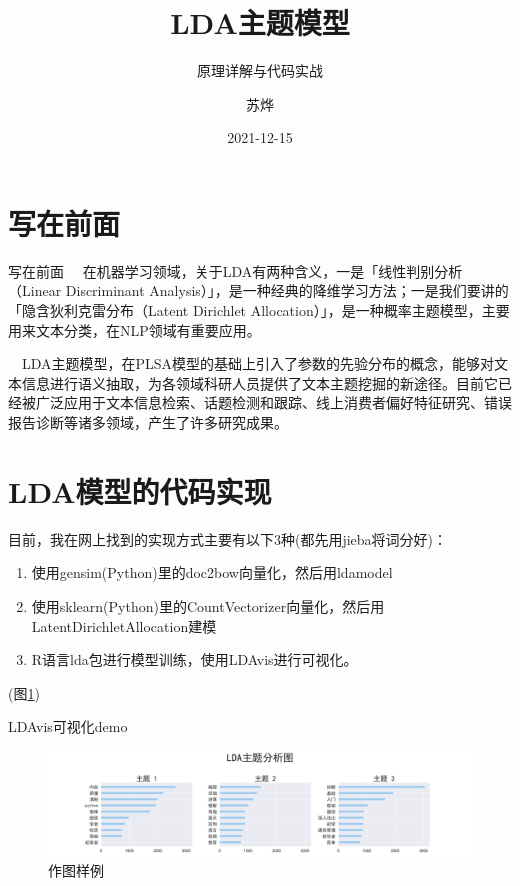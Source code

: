\documentclass[
  ignorenonframetext,
]{beamer}
\title{LDA主题模型}
\subtitle{原理详解与代码实战}
\author{苏烨}
\date{2021-12-15}
\institute{统计与数学学院}
\providecommand{\tightlist}{%
  \setlength{\itemsep}{0pt}\setlength{\parskip}{0pt}}
\begin{document}
\frame{\titlepage}

\begin{frame}[allowframebreaks]
  \tableofcontents[hideallsubsections]
\end{frame}
\hypertarget{ux5199ux5728ux524dux9762}{%
\section{写在前面}\label{ux5199ux5728ux524dux9762}}

\begin{frame}{写在前面}
\(\quad\)在机器学习领域，关于LDA有两种含义，一是「线性判别分析（Linear Discriminant Analysis）」，是一种经典的降维学习方法；一是我们要讲的「隐含狄利克雷分布（Latent Dirichlet Allocation）」，是一种概率主题模型，主要用来文本分类，在NLP领域有重要应用。

\(\quad\)LDA主题模型，在PLSA模型的基础上引入了参数的先验分布的概念，能够对文本信息进行语义抽取，为各领域科研人员提供了文本主题挖掘的新途径。目前它已经被广泛应用于文本信息检索、话题检测和跟踪、线上消费者偏好特征研究、错误报告诊断等诸多领域，产生了许多研究成果。
\end{frame}

\hypertarget{ldaux6a21ux578bux7684ux4ee3ux7801ux5b9eux73b0}{%
\section{LDA模型的代码实现}\label{ldaux6a21ux578bux7684ux4ee3ux7801ux5b9eux73b0}}

\begin{frame}{目前，我在网上找到的实现方式主要有以下3种(都先用jieba将词分好)：}
\protect\hypertarget{ux76eeux524dux6211ux5728ux7f51ux4e0aux627eux5230ux7684ux5b9eux73b0ux65b9ux5f0fux4e3bux8981ux6709ux4ee5ux4e0b3ux79cdux90fdux5148ux7528jiebaux5c06ux8bcdux5206ux597d}{}
\begin{enumerate}[<+->]
\tightlist
\item
  使用gensim(Python)里的doc2bow向量化，然后用ldamodel
\item
  使用sklearn(Python)里的CountVectorizer向量化，然后用LatentDirichletAllocation建模
\item
  R语言lda包进行模型训练，使用LDAvis进行可视化。
\end{enumerate}

(图\ref{fig:fig1})
\end{frame}

\begin{frame}{LDAvis可视化demo}
\protect\hypertarget{ldavisux53efux89c6ux5316demo}{}
\begin{figure}

{\centering \includegraphics[width=0.5\linewidth,height=0.5\textheight]{pic/LDAdemo} 

}

\caption{作图样例}\label{fig:fig1}
\end{figure}
\end{frame}
\end{document}

